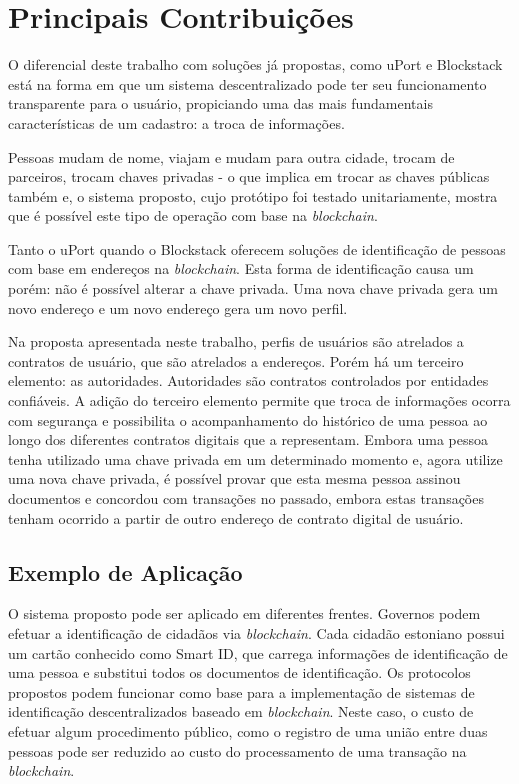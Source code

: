 \documentclass[tcc,capa]{texufpel}
\begin{document}
    \section{Principais Contribuições}
    
        O diferencial deste trabalho com soluções já propostas, como uPort e Blockstack está na forma em que um sistema descentralizado pode ter seu funcionamento transparente para o usuário, propiciando uma das mais fundamentais características de um cadastro: a troca de informações.
    
        Pessoas mudam de nome, viajam e mudam para outra cidade, trocam de parceiros, trocam chaves privadas - o que implica em trocar as chaves públicas também e, o sistema proposto, cujo protótipo foi testado unitariamente, mostra que é possível este tipo de operação com base na \textit{blockchain}.
    
        Tanto o uPort quando o Blockstack oferecem soluções de identificação de pessoas com base em endereços na \textit{blockchain}. Esta forma de identificação causa um porém: não é possível alterar a chave privada. Uma nova chave privada gera um novo endereço e um novo endereço gera um novo perfil. 
    
        Na proposta apresentada neste trabalho, perfis de usuários são atrelados a contratos de usuário, que são atrelados a endereços. Porém há um terceiro elemento: as autoridades. Autoridades são contratos controlados por entidades confiáveis. A adição do terceiro elemento permite que troca de informações ocorra com segurança e possibilita o acompanhamento do histórico de uma pessoa ao longo dos diferentes contratos digitais que a representam. Embora uma pessoa tenha utilizado uma chave privada em um determinado momento e, agora utilize uma nova chave privada, é possível provar que esta mesma pessoa assinou documentos e concordou com transações no passado, embora estas transações tenham ocorrido a partir de outro endereço de contrato digital de usuário.
    
        \subsection{Exemplo de Aplicação}
            
            O sistema proposto pode ser aplicado em diferentes frentes. Governos podem efetuar a identificação de cidadãos via \textit{blockchain}. Cada cidadão estoniano possui um cartão conhecido como Smart ID, que carrega informações de identificação de uma pessoa e substitui todos os documentos de identificação. Os protocolos propostos podem funcionar como base para a implementação de sistemas de identificação descentralizados baseado em \textit{blockchain}. Neste caso, o custo de efetuar algum procedimento público, como o registro de uma união entre duas pessoas pode ser reduzido ao custo do processamento de uma transação na \textit{blockchain}.
            
\end{document}
